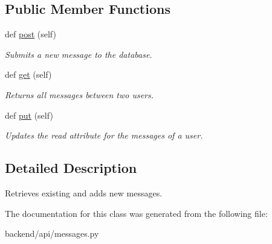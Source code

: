 \subsection*{Public Member Functions}
\begin{DoxyCompactItemize}
\item 
\hypertarget{classbackend_1_1api_1_1messages_1_1_chat_message_api_a231f91c058860c3ce24e40933e87eb9a}{}def \hyperlink{classbackend_1_1api_1_1messages_1_1_chat_message_api_a231f91c058860c3ce24e40933e87eb9a}{post} (self)\label{classbackend_1_1api_1_1messages_1_1_chat_message_api_a231f91c058860c3ce24e40933e87eb9a}

\begin{DoxyCompactList}\small\item\em Submits a new message to the database. \end{DoxyCompactList}\item 
\hypertarget{classbackend_1_1api_1_1messages_1_1_chat_message_api_a04ee48bc662586028f63d36abaa30a7f}{}def \hyperlink{classbackend_1_1api_1_1messages_1_1_chat_message_api_a04ee48bc662586028f63d36abaa30a7f}{get} (self)\label{classbackend_1_1api_1_1messages_1_1_chat_message_api_a04ee48bc662586028f63d36abaa30a7f}

\begin{DoxyCompactList}\small\item\em Returns all messages between two users. \end{DoxyCompactList}\item 
\hypertarget{classbackend_1_1api_1_1messages_1_1_chat_message_api_a41cdf2ec5fdeb26ae0866840800257f1}{}def \hyperlink{classbackend_1_1api_1_1messages_1_1_chat_message_api_a41cdf2ec5fdeb26ae0866840800257f1}{put} (self)\label{classbackend_1_1api_1_1messages_1_1_chat_message_api_a41cdf2ec5fdeb26ae0866840800257f1}

\begin{DoxyCompactList}\small\item\em Updates the \textquotesingle{}read\textquotesingle{} attribute for the messages of a user. \end{DoxyCompactList}\end{DoxyCompactItemize}


\subsection{Detailed Description}
Retrieves existing and adds new messages. 

The documentation for this class was generated from the following file\+:\begin{DoxyCompactItemize}
\item 
backend/api/messages.\+py\end{DoxyCompactItemize}
